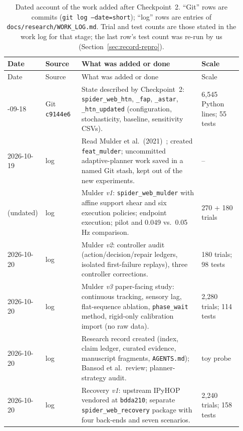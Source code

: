 {\small
\setlength{\tabcolsep}{4pt}
\begin{longtable}{@{}p{0.11\linewidth}p{0.15\linewidth}p{0.50\linewidth}p{0.17\linewidth}@{}}
\caption{Dated account of the work added after Checkpoint~2. ``Git'' rows are commits
(\texttt{git log --date=short}); ``log'' rows are entries of \texttt{docs/\allowbreak{}research/\allowbreak{}WORK\_\allowbreak{}LOG.md}.
Trial and test counts are those stated in the work log for that stage; the last row's test count was
re-run by us (Section~\ref{sec:record-repro}).}
\label{tab:record-progress}\\
\toprule
Date & Source & What was added or done & Scale \\
\midrule
\endfirsthead
\toprule
Date & Source & What was added or done & Scale \\
\midrule
\endhead
\bottomrule
\endfoot
2026-09-18 & Git \texttt{c9144e6} & State described by Checkpoint~2: \texttt{spider\_web\_htn}, \texttt{\_fap},
  \texttt{\_astar}, \texttt{\_htn\_updated} (configuration, stochasticity, baseline, sensitivity CSVs). &
  6,545 Python lines; 55 tests \\
2026-10-19 & log & Read Mulder et al.\ (2021)~\cite{mulder2021dynamic}; created \texttt{feat\_mulder}; uncommitted
  adaptive-planner work saved in a named Git stash, kept out of the new experiments. & -- \\
(undated) & log & Mulder \emph{v1}: \texttt{spider\_\allowbreak{}web\_\allowbreak{}mulder} with affine support shear and six execution
  policies; endpoint execution; pilot and 0.049 vs.\ 0.05\,Hz comparison. & 270 + 180 trials \\
2026-10-20 & log & Mulder \emph{v2}: controller audit (action/decision/repair ledgers, isolated
  first-failure replays), three controller corrections. & 180 trials; 98 tests \\
2026-10-20 & log & Mulder \emph{v3} paper-facing study: continuous tracking, sensory lag, flat-sequence
  ablation, \texttt{phase\_wait} method, rigid-only calibration import (no raw data). & 2,280 trials; 114 tests \\
2026-10-20 & log & Research record created (index, claim ledger, curated evidence, manuscript fragments,
  \texttt{AGENTS.md}); Bansod et al.\ review; planner-strategy audit. & toy probe \\
2026-10-20 & log & Recovery \emph{v1}: upstream IPyHOP vendored at \texttt{bdda210}; separate
  \texttt{spider\_\allowbreak{}web\_\allowbreak{}recovery} package with four back-ends and seven scenarios. & 2,240 trials; 158 tests \\

\end{longtable}}
